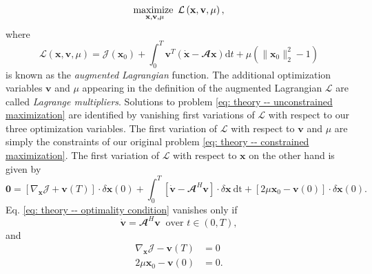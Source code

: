       \begin{equation}
        \maximize \limits_{\mathbf{x}, \mathbf{v}, \mu} \mathcal{L} \left( \mathbf{x}, \mathbf{v}, \mu \right),
        \label{eq: theory -- unconstrained maximization}
      \end{equation}
      where
      \begin{equation}
        \mathcal{L} \left( \mathbf{x}, \mathbf{v}, \mu \right) = \mathcal{J}\left( \mathbf{x}_0 \right) + \int_{0}^T \mathbf{v}^T \left( \dot{\mathbf{x}} - \mathbfcal{A}\mathbf{x} \right) \mathrm{d}t + \mu \left( \| \mathbf{x}_0 \|_2^2 - 1 \right)
        \label{eq: theory -- augmented Lagrangian}
      \end{equation}
      is known as the \emph{augmented Lagrangian} function. The additional optimization variables $\mathbf{v}$ and $\mu$ appearing in the definition of the augmented Lagrangian $\mathcal{L}$ are called \emph{Lagrange multipliers}. Solutions to problem \eqref{eq: theory -- unconstrained maximization} are identified by vanishing first variations of $\mathcal{L}$ with respect to our three optimization variables. The first variation of $\mathcal{L}$ with respect to $\mathbf{v}$ and $\mu$ are simply the constraints of our original problem \eqref{eq: theory -- constrained maximization}. The first variation of $\mathcal{L}$ with respect to $\mathbf{x}$ on the other hand is given by
      \begin{equation}
        \mathbf{0} = \left[ \nabla_{\mathbf{x}} \mathcal{J} + \mathbf{v}(T) \right] \cdot \delta \mathbf{x}(0) + \int_0^T \left[ \dot{\mathbf{v}} - \mathbfcal{A}^H \mathbf{v} \right] \cdot \delta \mathbf{x} \ \mathrm{dt} + \left[ 2\mu \mathbf{x}_0 - \mathbf{v}(0) \right] \cdot \delta \mathbf{x}(0).
        \label{eq: theory -- optimality condition}
      \end{equation}
      Eq. \eqref{eq: theory -- optimality condition} vanishes only if
      \begin{equation}
        \dot{\mathbf{v}} = \mathbfcal{A}^H \mathbf{v} \ \text{ over } t \in \left( 0, T \right),
        \label{eq: theory -- adjoint equations}
      \end{equation}
      and
      \begin{equation}
        \begin{aligned}
          \nabla_{\mathbf{x}} \mathcal{J} - \mathbf{v}(T) & = 0 \\
          2\mu \mathbf{x}_0 - \mathbf{v}(0) & = 0.
        \end{aligned}
        \label{eq: theory -- compatibility conditions}
      \end{equation}

